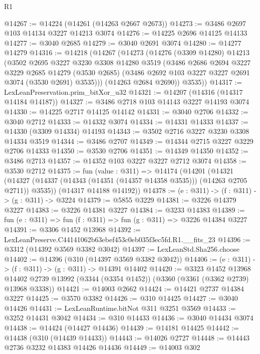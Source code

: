 \begin{lexlean}{R1}
\begin{coremodule}
@14267 := @14224 (@14261 (@14263 @2667 @2673))
@14273 := @3486 @2697 @103 @14134 @3227 @14213 @3074
@14276 := @14225 @2696 @14125 @14133
@14277 := @3040 @2685
@14279 := @3040 @2691 @3074
@14280 := @14277 @14279
@14316 := @14218
    (@14267
      (@14273
        (@14276
          (@3309 @14280)
          @14213
          (@3502
            @2695
            @3227
            @3230
            @3308
            @14280
            @3519
            (@3486
              @2686
              @2694
              @3227
              @3229
              @2685
              @14279
              (@3530 @2685)
              (@3486 @2692 @103 @3227 @3227 @2691 @3074 (@3530 @2691) @3535)))
          (@14263 @2684 @2690))
        @3535))
@14317 := LexLeanPreservation.prim_bitXor_u32
@14321 := @14207 (@14316 (@14317 @14184 @14187))
@14327 := @3486 @2718 @103 @14143 @3227 @14193 @3074
@14330 := @14225 @2717 @14125 @14142
@14331 := @3040 @2706
@14332 := @3040 @2712
@14333 := @14332 @3074
@14334 := @14331 @14333
@14337 := @14330 (@3309 @14334) @14193
@14343 := @3502 @2716 @3227 @3230 @3308 @14334 @3519
@14344 := @3486 @2707
@14349 := @14344 @2715 @3227 @3229 @2706 @14333
@14350 := @3530 @2706
@14351 := @14349 @14350
@14352 := @3486 @2713
@14357 := @14352 @103 @3227 @3227 @2712 @3074
@14358 := @3530 @2712
@14375 := fun (value : @311) =>
  @14174
    (@14201
      (@14321 (@14327 (@14337 (@14343 (@14351 (@14357 @14358 @3535))) (@14263 @2705 @2711)) @3535))
      (@14317 @14188 @14192))
@14378 := (e : @311) -> (f : @311) -> (g : @311) -> @3224
@14379 := @5855 @3229
@14381 := @3226 @14379 @3227
@14383 := @3226 @14381 @3227
@14384 := @3233 @14383
@14389 := fun (e : @311) => fun (f : @311) => fun (g : @311) => @3226 @14384 @3227
@14391 := @3306 @1452 @13968
@14392 := LexLeanPreserve.C44141062b63ebef453c0eb035f3ec5fd.R1.__fits_23
@14396 := @3312 (@14392 @3569 @3382 @3042)
@14397 := LexLeanStd.Sha256.choose
@14402 := @14396 (@310 (@14397 @3569 @3382 @3042))
@14406 := (e : @311) -> (f : @311) -> (g : @311) -> @14391 @14402
@14420 := @3323
    @1452
    @13968
    @14402
    @2739
    @13992
    (@3344 (@3354 @1452))
    (@3360 (@3361 (@3362 @2739) @13968 @3338))
@14421 := @14003 @2662
@14424 := @14421 @2737 @14384 @3227
@14425 := @3570 @3382
@14426 := @310 @14425
@14427 := @3040 @14426
@14431 := LexLeanRuntime.bitNot @311 @3251 @3569
@14433 := @3252 @14431 @3042
@14434 := @310 @14433
@14436 := @3040 @14434 @3074
@14438 := @14424 (@14427 @14436)
@14439 := @14181 @14425
@14442 := @14438 (@310 (@14439 @14433))
@14443 := @14026 @2727
@14448 := @14443 @2736 @3232 @14383 @14426 @14436
@14449 := @14003 @302

\end{coremodule}
\end{lexlean}
